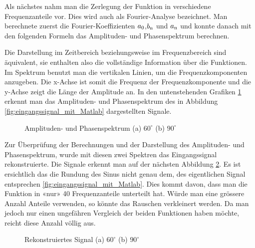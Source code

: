 Als nächstes nahm man die Zerlegung der Funktion in verschiedene Frequenzanteile vor. Dies wird auch als Fourier-Analyse bezeichnet. Man berechnete zuerst die Fourier-Koeffizienten $a\textsubscript{0}$,$b\textsubscript{n}$ und $a\textsubscript{n}$ und konnte danach mit den folgenden Formeln das Amplituden- und Phasenspektrum berechnen.



 Die Darstellung im Zeitbereich beziehungsweise im Frequenzbereich sind äquivalent, sie enthalten also die vollständige Information über die Funktionen. Im Spektrum benutzt man die vertikalen Linien, um die Frequenzkomponenten anzugeben. Die x-Achse ist somit die Frequenz der Frequenzkomponente und die y-Achse zeigt die Länge der Amplitude an. In den untenstehenden Grafiken \ref{fig:Amplituden- und Phasenspektrum} erkennt man das Amplituden- und Phasenspektrum des in Abbildung \ref{fig:eingangssignal_mit_Matlab} dargestellten Signale.

\begin{figure}[h]
	\centering
	\qquad
	\caption{Amplituden- und Phasenspektrum (a) $60^\circ$ (b) $90^\circ$}
	\label{fig:Amplituden- und Phasenspektrum}
\end{figure} 

Zur Überprüfung der Berechnungen und der Darstellung des Amplituden- und Phasenspektrum, wurde mit diesen zwei Spektren das Eingangssignal rekonstruierte. Die Signale erkennt man auf der nächsten Abbildung \ref{fig:Rekonstruiertes Signal}. Es ist ersichtlich das die Rundung des Sinus nicht genau dem, des eigentlichen Signal entsprechen \ref{fig:eingangssignal_mit_Matlab}. Dies kommt davon, dass man die Funktion in «nur» 40 Frequenzanteile unterteilt hat. Würde man eine grössere Anzahl Anteile verwenden, so könnte das Rauschen verkleinert werden. Da man jedoch nur einen ungefähren Vergleich der beiden Funktionen haben möchte, reicht diese Anzahl völlig aus. 

\begin{figure}[h]
	\centering
	\qquad
	\caption{Rekonstruiertes Signal (a) $60^\circ$ (b) $90^\circ$}
	\label{fig:Rekonstruiertes Signal}
\end{figure} 


